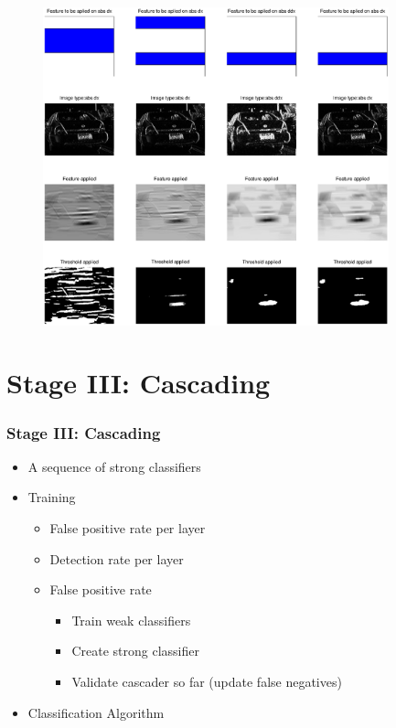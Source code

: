 \documentclass{beamer}
\begin{document}
\frame
{
	\begin{figure}[!ht]
	\centering
	\includegraphics[width=10cm]{../report/img/strongClassifier_layer2_img14}
	\label{fig:strongclassify}
	\end{figure}
}

\section{Stage III: Cascading}
\frame
{
  \frametitle{Stage III: Cascading}
	
  \begin{itemize}
  \item <+-| alert@+> A sequence of strong classifiers
  \item <+-| alert@+> Training
  \begin{itemize}
  	\item False positive rate per layer
  	\item Detection rate per layer
  	\item False positive rate
	\begin{itemize}
		\item <+| alert@+> Train weak classifiers
		\item <+| alert@+> Create strong classifier
		\item <+| alert@+> Validate cascader so far (update false negatives)
	\end{itemize}
  \end{itemize}
  \item <+-| alert@+> Classification Algorithm
  \end{itemize}
}
\end{document}
